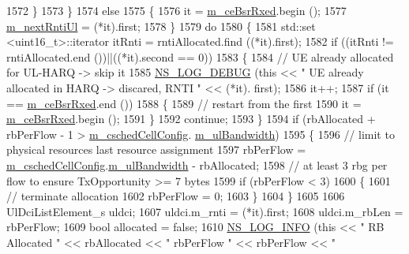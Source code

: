 \begin{DoxyCode}
1572         \}
1573     \}
1574   \textcolor{keywordflow}{else}
1575     \{
1576       it = \hyperlink{classns3_1_1FdBetFfMacScheduler_a86411f2dd593676d88de396ef4d0b6e5}{m\_ceBsrRxed}.begin ();
1577       \hyperlink{classns3_1_1FdBetFfMacScheduler_ade4e2b997a835d6205e7275d58884c41}{m\_nextRntiUl} = (*it).first;
1578     \}
1579   \textcolor{keywordflow}{do}
1580     \{
1581       std::set <uint16\_t>::iterator itRnti = rntiAllocated.find ((*it).first);
1582       \textcolor{keywordflow}{if} ((itRnti != rntiAllocated.end ())||((*it).second == 0))
1583         \{
1584           \textcolor{comment}{// UE already allocated for UL-HARQ -> skip it}
1585           \hyperlink{group__logging_ga413f1886406d49f59a6a0a89b77b4d0a}{NS\_LOG\_DEBUG} (\textcolor{keyword}{this} << \textcolor{stringliteral}{" UE already allocated in HARQ -> discared, RNTI "} << (*it).
      first);
1586           it++;
1587           \textcolor{keywordflow}{if} (it == \hyperlink{classns3_1_1FdBetFfMacScheduler_a86411f2dd593676d88de396ef4d0b6e5}{m\_ceBsrRxed}.end ())
1588             \{
1589               \textcolor{comment}{// restart from the first}
1590               it = \hyperlink{classns3_1_1FdBetFfMacScheduler_a86411f2dd593676d88de396ef4d0b6e5}{m\_ceBsrRxed}.begin ();
1591             \}
1592           \textcolor{keywordflow}{continue};
1593         \}
1594       \textcolor{keywordflow}{if} (rbAllocated + rbPerFlow - 1 > \hyperlink{classns3_1_1FdBetFfMacScheduler_a52a10018d36c6a2e69820346a327dfc9}{m\_cschedCellConfig}.
      \hyperlink{structns3_1_1FfMacCschedSapProvider_1_1CschedCellConfigReqParameters_a5ab5b102878e6e7e7727a14af4a64d2f}{m\_ulBandwidth})
1595         \{
1596           \textcolor{comment}{// limit to physical resources last resource assignment}
1597           rbPerFlow = \hyperlink{classns3_1_1FdBetFfMacScheduler_a52a10018d36c6a2e69820346a327dfc9}{m\_cschedCellConfig}.\hyperlink{structns3_1_1FfMacCschedSapProvider_1_1CschedCellConfigReqParameters_a5ab5b102878e6e7e7727a14af4a64d2f}{m\_ulBandwidth} - rbAllocated;
1598           \textcolor{comment}{// at least 3 rbg per flow to ensure TxOpportunity >= 7 bytes}
1599           \textcolor{keywordflow}{if} (rbPerFlow < 3)
1600             \{
1601               \textcolor{comment}{// terminate allocation}
1602               rbPerFlow = 0;
1603             \}
1604         \}
1605 
1606       UlDciListElement\_s uldci;
1607       uldci.m\_rnti = (*it).first;
1608       uldci.m\_rbLen = rbPerFlow;
1609       \textcolor{keywordtype}{bool} allocated = \textcolor{keyword}{false};
1610       \hyperlink{group__logging_gafbd73ee2cf9f26b319f49086d8e860fb}{NS\_LOG\_INFO} (\textcolor{keyword}{this} << \textcolor{stringliteral}{" RB Allocated "} << rbAllocated << \textcolor{stringliteral}{" rbPerFlow "} << rbPerFlow << \textcolor{stringliteral}{"
}
\end{DoxyCode}
